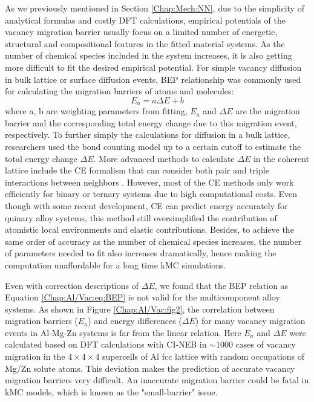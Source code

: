 As we previously mentioned in Section \ref{Chap:Mech:NN}, due to the simplicity of analytical formulas and costly \ac{DFT} calculations, empirical potentials of the vacancy migration barrier usually focus on a limited number of energetic, structural and compositional features in the fitted material systems. As the number of chemical species included in the system increases, it is also getting more difficult to fit the desired empirical potential. For simple vacancy diffusion in bulk lattice or surface diffusion events, \acf{BEP} relationship \cite{bronsted1924katalytische, evans1936further, bell1936theory} was commonly used for calculating the migration barriers of atoms and molecules:
\begin{equation}
\label{Chap:Al/Vac:eq:BEP}
E_a = a \Delta E + b
\end{equation}
where a, b are weighting parameters from fitting, $E_a$ and $\Delta E$ are the migration barrier and the corresponding total energy change due to this migration event, respectively. To further simply the calculations for diffusion in a bulk lattice, researchers used the bond counting model up to a certain cutoff to estimate the total energy change $\Delta E$\cite{soisson1996monte, soisson2010atomistic}. More advanced methods to calculate $\Delta E$ in the coherent lattice include the \acf{CE} formalism that can consider both pair and triple interactions between neighbors \cite{sanchez1984generalized,zunger1994statics,van2001first,persson2010lj,natarajan2016early}. However, most of the \ac{CE} methods only work efficiently for binary or ternary systems due to high computational costs\cite{wu2016cluster}. Even though with some recent development\cite{nguyen2017cluster}, \ac{CE} can predict energy accurately for quinary alloy systems, this method still oversimplified the contribution of atomistic local environments and elastic contributions. Besides, to achieve the same order of accuracy as the number of chemical species increases, the number of parameters needed to fit also increases dramatically\cite{castin2008use}, hence making the computation unaffordable for a long time \ac{kMC} simulations.

Even with correction descriptions of $\Delta E$, we found that the \ac{BEP} relation as Equation \ref{Chap:Al/Vac:eq:BEP} is not valid for the multicomponent alloy systems. As shown in Figure \ref{Chap:Al/Vac:fig2}, the correlation between migration barriers ($E_a$) and energy differences ($\Delta E$) for many vacancy migration events in Al-Mg-Zn systems is far from the linear relation. Here $E_a$ and $\Delta E$ were calculated based on DFT calculations with \acf{CI-NEB}\cite{henkelman2000climbing,henkelman2000improved} in $\sim$1000 cases of vacancy migration in the $4\times4\times4$ supercells of Al fcc lattice with random occupations of Mg/Zn solute atoms. This deviation makes the prediction of accurate vacancy migration barriers very difficult. An inaccurate migration barrier could be fatal in \ac{kMC} models, which is known as the "small-barrier" issue\cite{miron2004multiple}. 


